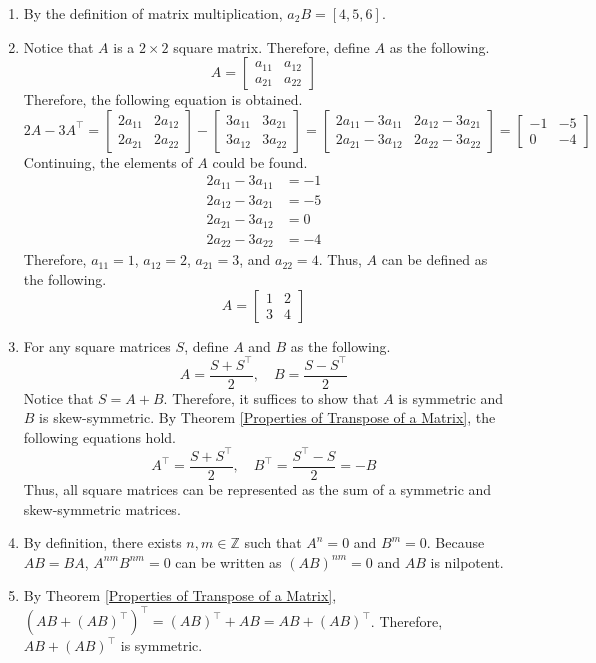 \documentclass[../main.tex]{subfiles}
\begin{document}
\begin{enumerate}
\item
By the definition of matrix multiplication, $a_2B = [4, 5, 6]$.

\item
Notice that $A$ is a $2 \times 2$ square matrix. Therefore, define
$A$ as the following.
\[
A =
\begin{bmatrix}
    a_{11} & a_{12} \\
    a_{21} & a_{22}
\end{bmatrix}
\]
Therefore, the following equation is obtained.
\[
2A - 3A^\intercal =
\begin{bmatrix}
    2a_{11} & 2a_{12} \\
    2a_{21} & 2a_{22}
\end{bmatrix}
-
\begin{bmatrix}
    3a_{11} & 3a_{21} \\
    3a_{12} & 3a_{22}
\end{bmatrix}
=
\begin{bmatrix}
    2a_{11} - 3a_{11} & 2a_{12} - 3a_{21} \\
    2a_{21} - 3a_{12} & 2a_{22} - 3a_{22}
\end{bmatrix}
=
\begin{bmatrix}
    -1 & -5 \\
    0  & -4
\end{bmatrix}
\]
Continuing, the elements of $A$ could be found.
\begin{align*}
    2a_{11} - 3a_{11} &= -1 \\
    2a_{12} - 3a_{21} &= -5 \\
    2a_{21} - 3a_{12} &= 0  \\
    2a_{22} - 3a_{22} &= -4
\end{align*}
Therefore, $a_{11} = 1$, $a_{12} = 2$, $a_{21} = 3$, and $a_{22} = 4$.
Thus, $A$ can be defined as the following.
\[
A =
\begin{bmatrix}
    1 & 2 \\
    3 & 4
\end{bmatrix}
\]

\item
For any square matrices $S$, define $A$ and $B$ as the following.
\[
A = \frac{S + S^\intercal}{2}, \quad
B = \frac{S - S^\intercal}{2}
\]
Notice that $S = A + B$. Therefore, it suffices to show that $A$ is
symmetric and $B$ is skew-symmetric. By Theorem \ref{Properties of
Transpose of a Matrix}, the following equations hold.
\[
A^\intercal
= \frac{S + S^\intercal}{2}, \quad
B^\intercal
= \frac{S^\intercal - S}{2}
= -B
\]
Thus, all square matrices can be represented as the sum of a symmetric
and skew-symmetric matrices.

\item
By definition, there exists $n, m \in \mathbb{Z}$ such that
$A^n = 0$ and $B^m = 0$. Because $AB = BA$, $A^{nm} B^{nm} = 0$ can
be written as $(AB)^{nm} = 0$ and $AB$ is nilpotent.

\item
By Theorem \ref{Properties of Transpose of a Matrix}, $(AB +
(AB)^\intercal)^\intercal = (AB)^\intercal + AB = AB +
(AB)^\intercal$. Therefore, $AB + (AB)^\intercal$ is symmetric.
\end{enumerate}
\end{document}
